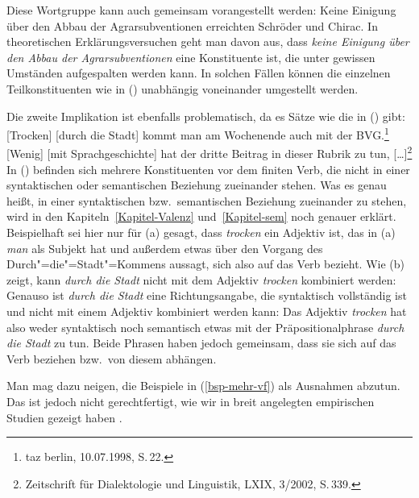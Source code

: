 Diese Wortgruppe kann auch gemeinsam vorangestellt werden:
\ea
Keine Einigung über den Abbau der Agrarsubventionen erreichten Schröder und Chirac.
\z
In theoretischen Erklärungsversuchen geht man davon aus, dass \emph{keine Einigung über den Abbau der Agrarsubventionen}
eine Konstituente ist, die unter gewissen Umständen aufgespalten werden kann. In solchen Fällen können die einzelnen
Teilkonstituenten wie in () unabhängig voneinander umgestellt werden.



Die zweite Implikation ist ebenfalls problematisch, da es Sätze
wie die in () gibt:
\eal
\label{bsp-mehr-vf}
\ex\label{bsp-trocken-durch-die-stadt}
{}[Trocken] [durch die Stadt] kommt man am Wochenende auch mit der BVG.\footnote{
        taz berlin, 10.07.1998, S.\,22.
      }
\ex {}[Wenig] [mit Sprachgeschichte] hat der dritte Beitrag in dieser Rubrik zu tun, [\ldots]\footnote{
  Zeitschrift für Dialektologie und Linguistik, LXIX, 3/2002, S.\,339.
}
\zl
In () befinden sich mehrere Konstituenten vor dem finiten Verb, die nicht in einer syntaktischen
oder semantischen
Beziehung zueinander stehen. Was es genau heißt,
in einer syntaktischen bzw.\ semantischen Beziehung zueinander zu stehen, wird in den
Kapiteln~\ref{Kapitel-Valenz} und~\ref{Kapitel-sem} noch genauer erklärt. Beispielhaft sei hier nur
für (a) gesagt, dass \emph{trocken} ein Adjektiv ist, das in (a) \emph{man}
als Subjekt hat und außerdem etwas über den Vorgang des Durch"=die"=Stadt"=Kommens aussagt,
sich also auf das Verb bezieht. Wie (b) zeigt, kann \emph{durch die Stadt} nicht
mit dem Adjektiv \emph{trocken} kombiniert werden:
\eal
{}
\zl
Genauso ist \emph{durch die Stadt} eine Richtungsangabe, die syntaktisch vollständig ist
und nicht mit einem Adjektiv kombiniert werden kann:
\eal
{}
\zl
Das Adjektiv \emph{trocken} hat also weder syntaktisch noch semantisch etwas mit 
der Präpositionalphrase \emph{durch die Stadt} zu tun. Beide Phrasen haben jedoch gemeinsam,
dass sie sich auf das Verb beziehen bzw.\ von diesem abhängen.

Man mag dazu neigen, die Beispiele in (\ref{bsp-mehr-vf}) als Ausnahmen
abzutun. Das ist jedoch nicht gerechtfertigt, wie wir in breit angelegten empirischen
Studien gezeigt haben \parencites{Mueller2003b}[Abschnitt~3.1]{MuellerGS}{Bildhauer2011a}.

